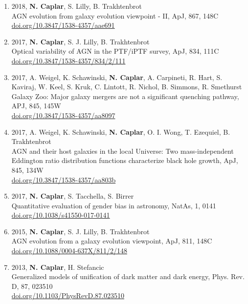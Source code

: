 \documentclass[11pt,letterpaper]{article}
\begin{document}
\begin{enumerate}
\item 2018, \textbf{N. Caplar}, S. Lilly, B. Trakhtenbrot\\
AGN evolution from galaxy evolution viewpoint - II, ApJ, 867, 148C\\
\href{https://doi.org/10.3847/1538-4357/aae691}{doi.org/10.3847/1538-4357/aae691} \\ 

\item 2017,  \textbf{N. Caplar}, S. J. Lilly, B. Trakhtenbrot   \\Optical variability of AGN in the PTF/iPTF survey, ApJ, 834, 111C   \\
 \href{https://doi.org/10.3847/1538-4357/834/2/111}{doi.org/10.3847/1538-4357/834/2/111} \\ 
 
\item 2017, A. Weigel, K. Schawinski,  \textbf{N. Caplar}, A. Carpineti, R. Hart, S. Kaviraj, W. Keel, S. Kruk, C. Lintott, R. Nichol, B. Simmons, R. Smethurst
\\    Galaxy Zoo:  Major galaxy mergers are not a significant quenching pathway, APJ, 845, 145W \\
\href{https://doi.org/10.3847/1538-4357/aa8097}{doi.org/10.3847/1538-4357/aa8097} \\ 

\item 2017, A. Weigel, K. Schawinski,  \textbf{N. Caplar}, O. I. Wong, T. Ezequiel, B. Trakhtenbrot
\\    AGN and their host galaxies in the local Universe: Two mass-independent Eddington ratio distribution functions characterize black hole growth, ApJ, 845, 134W \\
 \href{https://doi.org/10.3847/1538-4357/aa803b}{doi.org/10.3847/1538-4357/aa803b} \\ 

\item 2017, \textbf{N. Caplar}, S. Tacchella, S. Birrer \\ Quantitative evaluation of gender bias in astronomy, NatAs, 1, 0141\\
\href{https://doi.org/10.1038/s41550-017-0141}{doi.org/10.1038/s41550-017-0141} \\ 

\item 2015,  \textbf{N. Caplar}, S. J. Lilly, B. Trakhtenbrot  \\AGN evolution from a galaxy evolution viewpoint, ApJ, 811, 148C \\
\href{https://doi.org/10.1088/0004-637X/811/2/148}{doi.org/10.1088/0004-637X/811/2/148} \\ 
  
 \item 2013,  \textbf{N. Caplar}, H. Stefancic  \\ Generalized models of unification of dark matter and dark energy, Phys. Rev. D, 87, 023510 \\
 \href{https://doi.org/10.1103/PhysRevD.87.023510}{doi.org/10.1103/PhysRevD.87.023510} \\ 

 
\end{enumerate}
\end{document}
